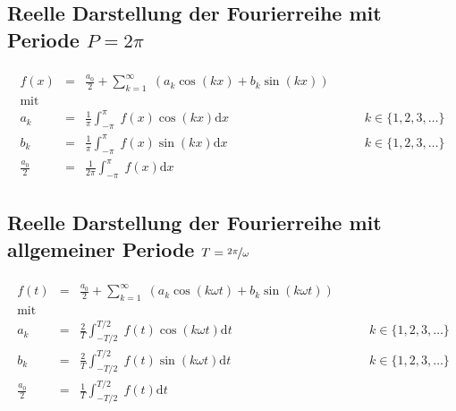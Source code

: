 \subsection[Fourierreihe reell mit Periode $P=2\pi$]{Reelle Darstellung der Fourierreihe mit Periode $P=2 \pi$}
\begin{align*}
\begin{array}{rcll}
f(x) & = & \frac{a_0}{2} + \sum_{k=1}^{\infty} \; (a_k \cos(k x) + b_k \sin(k x)) & {}\\
\mbox{mit} & {} & {} & {}\\
	a_k & = & \frac{1}{\pi} \int_{-\pi}^{\pi} \; f(x) \cos(k x) \mathrm{d}x & \qquad k \in \{1,2,3, \ldots \}\\ 
	b_k & = & \frac{1}{\pi} \int_{-\pi}^{\pi} \; f(x) \sin(k x) \mathrm{d}x & \qquad k \in \{1,2,3, \ldots \}\\ 
	\frac{a_0}{2} & = & \frac{1}{2 \pi} \int_{-\pi}^{\pi} \; f(x) \mathrm{d}x
\end{array}
\end{align*}
\subsection[Fourierreihe reell mit Periode $T=\nicefrac{2\pi}{\omega}$]{Reelle Darstellung der Fourierreihe mit allgemeiner Periode $T=\nicefrac{2 \pi}{\omega}$}
\begin{align*}
\begin{array}{rcll}
f(t) & = & \frac{a_0}{2} + \sum_{k=1}^{\infty} \; (a_k \cos(k \omega t) + b_k \sin(k \omega t))  & {}\\ 
\mbox{mit} & {} & {} & {}\\
	a_k & = & \frac{2}{T} \int_{-T/2}^{T/2} \; f(t) \cos(k \omega t) \mathrm{d}t & \qquad k \in \{1,2,3, \ldots \}\\ 
	b_k & = & \frac{2}{T} \int_{-T/2}^{T/2} \; f(t) \sin(k \omega t) \mathrm{d}t & \qquad k \in \{1,2,3, \ldots \}\\ 
	\frac{a_0}{2} & = & \frac{1}{T} \int_{-T/2}^{T/2} \; f(t) \mathrm{d}t
\end{array}
\end{align*}
